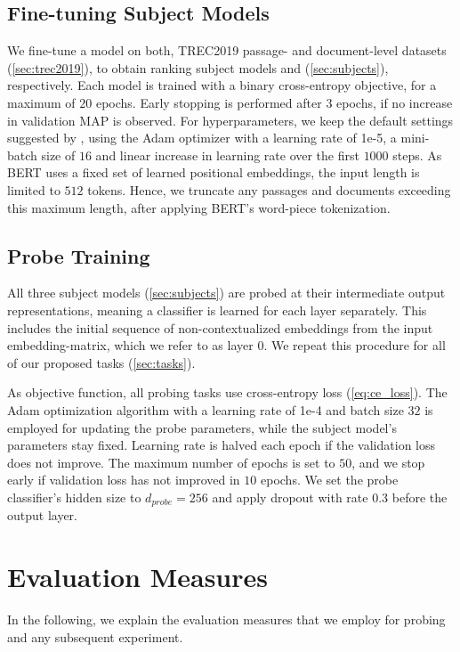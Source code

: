 \subsection{Fine-tuning Subject Models}
We fine-tune a  model on both, TREC2019 passage- and document-level datasets (\autoref{sec:trec2019}), to obtain ranking subject models  and  (\autoref{sec:subjects}), respectively. Each model is trained with a binary cross-entropy objective, for a maximum of $20$ epochs. Early stopping is performed after $3$ epochs, if no increase in validation MAP is observed. For hyperparameters, we keep the default settings suggested by \cite{devlin-etal-2019-bert}, using the Adam optimizer\cite{kingma2014adam} with a learning rate of 1e-5, a mini-batch size of $16$ and linear increase in learning rate over the first $1000$ steps. As BERT uses a fixed set of learned positional embeddings, the input length is limited to $512$ tokens. Hence, we truncate any passages and documents exceeding this maximum length, after applying BERT's word-piece tokenization.

\subsection{Probe Training}
All three subject models (\autoref{sec:subjects}) are probed at their intermediate output representations, meaning a classifier is learned for each layer separately. This includes the initial sequence of non-contextualized embeddings from the input embedding-matrix, which we refer to as layer $0$. We repeat this procedure for all of our proposed tasks (\autoref{sec:tasks}).

As objective function, all probing tasks use cross-entropy loss (\autoref{eq:ce_loss}). The Adam optimization algorithm \cite{kingma2014adam} with a learning rate of 1e-4 and batch size $32$ is employed for updating the probe parameters, while the subject model's parameters stay fixed. Learning rate is halved each epoch if the validation loss does not improve. The maximum number of epochs is set to $50$, and we stop early if validation loss has not improved in $10$ epochs. We set the probe classifier's hidden size to $d_{probe}=256$ and apply dropout with rate $0.3$ before the output layer.

\section{Evaluation Measures}
In the following, we explain the evaluation measures that we employ for probing and any subsequent experiment.

